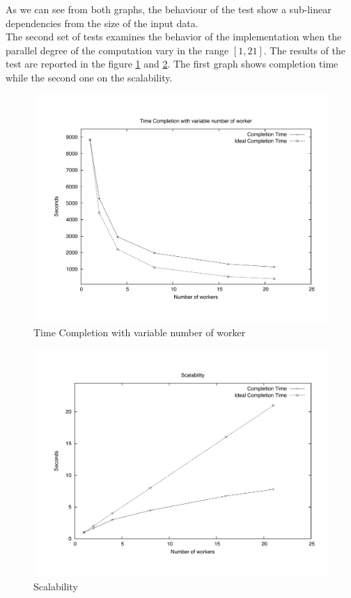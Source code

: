 As we can see from both graphs, the behaviour of the test show a sub-linear dependencies from the size of the input data. \\

The second set of tests examines the behavior of the implementation when the parallel degree of the computation vary in the range $[1, 21]$. 
The results of the test are reported in the figure \ref{NTime}  and \ref{NScal}. 
The first graph shows completion time while the second one on the scalability.

\begin{figure}[th]
	\centerline{
		\mbox{\includegraphics[scale=0.48]{HadoopTest/PsFiles/NTime.pdf}}
	}
	\caption{Time Completion with variable number of worker} 
        \label{NTime}
\end{figure}

\begin{figure}[th]
	\centerline{
		\mbox{\includegraphics[scale=0.48]{HadoopTest/PsFiles/NScal.pdf}}
	}
	\caption{Scalability} 
        \label{NScal}
\end{figure}

